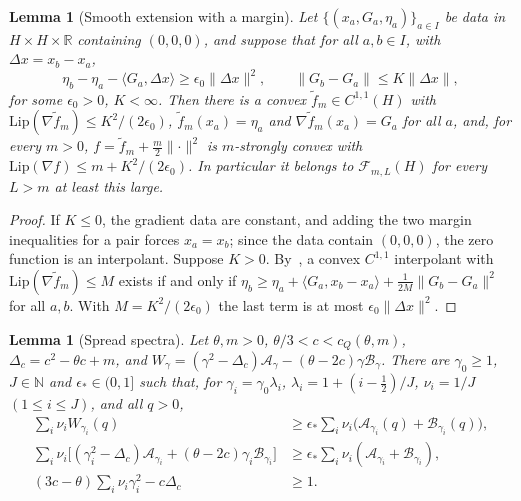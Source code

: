 \documentclass[11pt]{article}
\newtheorem{lemma}[theorem]{Lemma}
\theoremstyle{definition}
\theoremstyle{remark}
\newcommand{\R}{\mathbb R}
\newcommand{\N}{\mathbb N}
\newcommand{\cF}{\mathcal F}
\newcommand{\cA}{\mathcal A}
\newcommand{\cB}{\mathcal B}
\newcommand{\ip}[2]{\langle #1,#2\rangle}
\newcommand{\norm}[1]{\lVert #1\rVert}
\newcommand{\cQ}{c_{Q}}
\begin{document}
\begin{lemma}[Smooth extension with a margin]\label{lem:extend}
Let \(\{(x_a,G_a,\eta_a)\}_{a\in I}\) be data in \(H\times H\times\R\) containing \((0,0,0)\), and suppose that
for all \(a,b\in I\), with \(\Delta x=x_b-x_a\),
\[
\eta_b-\eta_a-\ip{G_a}{\Delta x}\ge\epsilon_0\norm{\Delta x}^2,\qquad \norm{G_b-G_a}\le K\norm{\Delta x},
\]
for some \(\epsilon_0>0\), \(K<\infty\).  Then there is a convex \(\tilde f_m\in C^{1,1}(H)\) with
\(\mathrm{Lip}(\nabla\tilde f_m)\le K^2/(2\epsilon_0)\), \(\tilde f_m(x_a)=\eta_a\) and \(\nabla\tilde f_m(x_a)=G_a\) for all \(a\), and, for every \(m>0\),
\(f=\tilde f_m+\frac m2\norm\cdot^2\) is \(m\)-strongly convex with
\(\mathrm{Lip}(\nabla f)\le m+K^2/(2\epsilon_0)\).
In particular it belongs to \(\cF_{m,L}(H)\) for every \(L>m\) at least this large.
\end{lemma}

\begin{proof}
If \(K\le0\), the gradient data are constant, and adding the two margin inequalities for a pair forces
\(x_a=x_b\); since the data contain \((0,0,0)\), the zero function is an
interpolant.  Suppose \(K>0\).  By~\cite[Theorem~1.3]{AM17}, a convex \(C^{1,1}\) interpolant with \(\mathrm{Lip}(\nabla\tilde f_m)\le M\) exists
if and only if \(\eta_b\ge\eta_a+\ip{G_a}{x_b-x_a}+\frac1{2M}\norm{G_b-G_a}^2\) for all \(a,b\).  With
\(M=K^2/(2\epsilon_0)\) the last term is at most \(\epsilon_0\norm{\Delta x}^2\).
\end{proof}

\begin{lemma}[Spread spectra]\label{lem:spread}
Let \(\theta,m>0\), \(\theta/3<c<\cQ(\theta,m)\), \(\Delta_c=c^2-\theta c+m\), and \(W_\gamma=(\gamma^2-\Delta_c)\cA_\gamma-(\theta-2c)\gamma\cB_\gamma\).
There are \(\gamma_0\ge1\), \(J\in\N\) and \(\epsilon_*\in(0,1]\) such that, for
\(\gamma_i=\gamma_0\lambda_i\), \(\lambda_i=1+(i-\frac12)/J\), \(\nu_i=1/J\) \((1\le i\le J)\), and all \(q>0\),
\begin{align}
\textstyle\sum_i\nu_iW_{\gamma_i}(q)&\ge\epsilon_*\textstyle\sum_i\nu_i\bigl(\cA_{\gamma_i}(q)+\cB_{\gamma_i}(q)\bigr),\label{eq:S1}\\
\textstyle\sum_i\nu_i\bigl[(\gamma_i^2-\Delta_c)\cA_{\gamma_i}+(\theta-2c)\gamma_i\cB_{\gamma_i}\bigr]&\ge\epsilon_*\textstyle\sum_i\nu_i(\cA_{\gamma_i}+\cB_{\gamma_i}),\label{eq:S2}\\
(3c-\theta)\textstyle\sum_i\nu_i\gamma_i^2-c\Delta_c&\ge1.\label{eq:S3}
\end{align}
\end{lemma}
\end{document}
